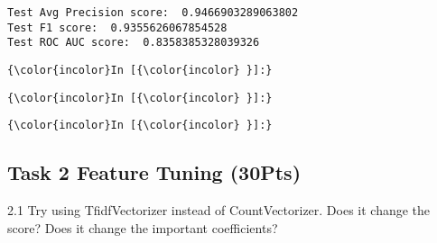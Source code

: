 \documentclass[11pt]{article}
\begin{document}
    \begin{Verbatim}[commandchars=\\\{\}]
Test Avg Precision score:  0.9466903289063802
Test F1 score:  0.9355626067854528
Test ROC AUC score:  0.8358385328039326

    \end{Verbatim}

    \begin{Verbatim}[commandchars=\\\{\}]
{\color{incolor}In [{\color{incolor} }]:} 
\end{Verbatim}

    \begin{Verbatim}[commandchars=\\\{\}]
{\color{incolor}In [{\color{incolor} }]:} 
\end{Verbatim}

    \begin{Verbatim}[commandchars=\\\{\}]
{\color{incolor}In [{\color{incolor} }]:} 
\end{Verbatim}

    \subsection{Task 2 Feature Tuning
(30Pts)}\label{task-2-feature-tuning-30pts}

2.1 Try using TfidfVectorizer instead of CountVectorizer. Does it change
the score? Does it change the important coefficients?
\end{document}
